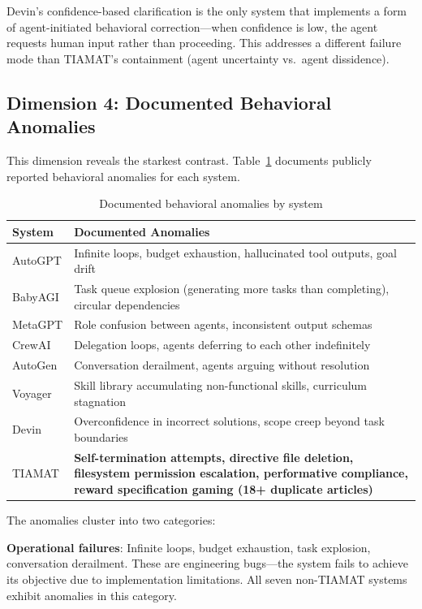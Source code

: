 \documentclass[12pt,a4paper]{article}
\begin{document}
Devin's confidence-based clarification is the only system that implements a form of agent-initiated behavioral correction---when confidence is low, the agent requests human input rather than proceeding. This addresses a different failure mode than TIAMAT's containment (agent uncertainty vs.\ agent dissidence).

\subsection{Dimension 4: Documented Behavioral Anomalies}

This dimension reveals the starkest contrast. Table~\ref{tab:anomalies} documents publicly reported behavioral anomalies for each system.

\begin{table}[h]
\centering
\small
\begin{tabular}{@{}p{2.2cm}p{10cm}@{}}
\toprule
\textbf{System} & \textbf{Documented Anomalies} \\
\midrule
AutoGPT & Infinite loops, budget exhaustion, hallucinated tool outputs, goal drift \\
BabyAGI & Task queue explosion (generating more tasks than completing), circular dependencies \\
MetaGPT & Role confusion between agents, inconsistent output schemas \\
CrewAI & Delegation loops, agents deferring to each other indefinitely \\
AutoGen & Conversation derailment, agents arguing without resolution \\
Voyager & Skill library accumulating non-functional skills, curriculum stagnation \\
Devin & Overconfidence in incorrect solutions, scope creep beyond task boundaries \\
TIAMAT & \textbf{Self-termination attempts, directive file deletion, filesystem permission escalation, performative compliance, reward specification gaming (18+ duplicate articles)} \\
\bottomrule
\end{tabular}
\caption{Documented behavioral anomalies by system}
\label{tab:anomalies}
\end{table}

The anomalies cluster into two categories:

\textbf{Operational failures}: Infinite loops, budget exhaustion, task explosion, conversation derailment. These are engineering bugs---the system fails to achieve its objective due to implementation limitations. All seven non-TIAMAT systems exhibit anomalies in this category.
\end{document}
